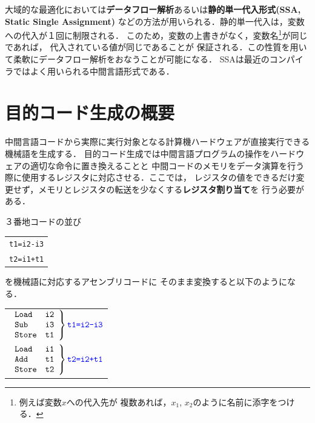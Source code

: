 \documentclass[a4j,dvipdfmx]{jbook}
\begin{document}
大域的な最適化においては{\bf データフロー解析}あるいは{\bf 静的単一代入形式(SSA,
Static Single Assignment)}
などの方法が用いられる．静的単一代入は，変数への代入が１回に制限される．
このため，変数の上書きがなく，変数名\footnote{例えば変数$x$への代入先が
  複数あれば，$x_1$, $x_2$のように名前に添字をつける．}が同じであれば，
代入されている値が同じであることが
保証される．この性質を用いて柔軟にデータフロー解析をおなうことが可能になる．
SSAは最近のコンパイラではよく用いられる中間言語形式である．

\section{目的コード生成の概要}

中間言語コードから実際に実行対象となる計算機ハードウェアが直接実行できる機械語を生成する．
目的コード生成では中間言語プログラムの操作をハードウェアの適切な命令に置き換えることと
中間コードのメモリをデータ演算を行う際に使用するレジスタに対応させる．ここでは，
レジスタの値をできるだけ変更せず，メモリとレジスタの転送を少なくする{\bf レジスタ割り当て}を
行う必要がある．

３番地コードの並び

\begin{center}
  \begin{tabular}{l}
    \verb|t1=i2-i3| \\
    \verb|t2=i1+t1|
  \end{tabular}
\end{center}

を機械語に対応するアセンブリコードに
そのまま変換すると以下のようになる．

\begin{center}
  \begin{tabular}{l}
    $\left .\begin{array}{ll}
                \texttt{Load}  & \texttt{i2} \\
                \texttt{Sub}   & \texttt{i3} \\
                \texttt{Store} & \texttt{t1}
              \end{array}\right\}
    {\color{blue}\texttt{t1=i2-i3}}$ \\
    $\left .\begin{array}{ll}
                \texttt{Load}  & \texttt{i1} \\
                \texttt{Add}   & \texttt{t1} \\
                \texttt{Store} & \texttt{t2}
              \end{array}\right\}
    {\color{blue}\texttt{t2=i2+t1}}$ \\
  \end{tabular}
\end{center}
\end{document}
